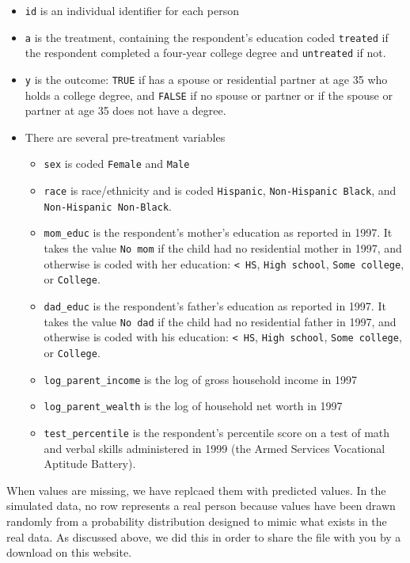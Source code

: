 \documentclass[
  letterpaper,
  DIV=11,
  numbers=noendperiod]{scrartcl}
\providecommand{\tightlist}{%
  \setlength{\itemsep}{0pt}\setlength{\parskip}{0pt}}\usepackage{longtable,booktabs,array}
\begin{document}
\begin{itemize}
\tightlist
\item
  \texttt{id} is an individual identifier for each person
\item
  \texttt{a} is the treatment, containing the respondent's education
  coded \texttt{treated} if the respondent completed a four-year college
  degree and \texttt{untreated} if not.
\item
  \texttt{y} is the outcome: \texttt{TRUE} if has a spouse or
  residential partner at age 35 who holds a college degree, and
  \texttt{FALSE} if no spouse or partner or if the spouse or partner at
  age 35 does not have a degree.
\item
  There are several pre-treatment variables

  \begin{itemize}
  \tightlist
  \item
    \texttt{sex} is coded \texttt{Female} and \texttt{Male}
  \item
    \texttt{race} is race/ethnicity and is coded \texttt{Hispanic},
    \texttt{Non-Hispanic\ Black}, and \texttt{Non-Hispanic\ Non-Black}.
  \item
    \texttt{mom\_educ} is the respondent's mother's education as
    reported in 1997. It takes the value \texttt{No\ mom} if the child
    had no residential mother in 1997, and otherwise is coded with her
    education: \texttt{\textless{}\ HS}, \texttt{High\ school},
    \texttt{Some\ college}, or \texttt{College}.
  \item
    \texttt{dad\_educ} is the respondent's father's education as
    reported in 1997. It takes the value \texttt{No\ dad} if the child
    had no residential father in 1997, and otherwise is coded with his
    education: \texttt{\textless{}\ HS}, \texttt{High\ school},
    \texttt{Some\ college}, or \texttt{College}.
  \item
    \texttt{log\_parent\_income} is the log of gross household income in
    1997
  \item
    \texttt{log\_parent\_wealth} is the log of household net worth in
    1997
  \item
    \texttt{test\_percentile} is the respondent's percentile score on a
    test of math and verbal skills administered in 1999 (the Armed
    Services Vocational Aptitude Battery).
  \end{itemize}
\end{itemize}

When values are missing, we have replcaed them with predicted values. In
the simulated data, no row represents a real person because values have
been drawn randomly from a probability distribution designed to mimic
what exists in the real data. As discussed above, we did this in order
to share the file with you by a download on this website.
\end{document}
